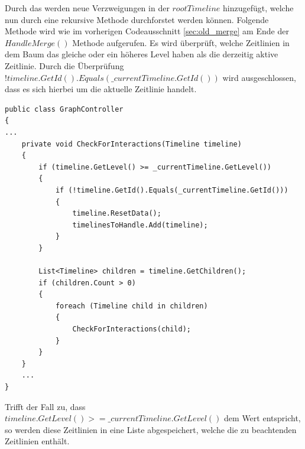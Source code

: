 Durch das  werden neue Verzweigungen in der $rootTimeline$ hinzugefügt, welche nun durch eine rekursive Methode durchforstet werden können. Folgende Methode wird wie im vorherigen Codeausschnitt \ref{sec:old_merge} am Ende der $HandleMerge()$ Methode aufgerufen. Es wird überprüft, welche Zeitlinien in dem Baum das gleiche oder ein höheres Level haben als die derzeitig aktive Zeitlinie. Durch die Überprüfung $!timeline.GetId().Equals(\_currentTimeline.GetId())$ wird ausgeschlossen, dass es sich hierbei um die aktuelle Zeitlinie handelt.

\begin{lstlisting}[caption={HandleMerge Methode aus dem alten Prototyp}, label={sec:old_checkForInteractions}]
public class GraphController
{
...
    private void CheckForInteractions(Timeline timeline)
    {
        if (timeline.GetLevel() >= _currentTimeline.GetLevel())
        {
            if (!timeline.GetId().Equals(_currentTimeline.GetId()))
            {
                timeline.ResetData();
                timelinesToHandle.Add(timeline);
            }
        }

        List<Timeline> children = timeline.GetChildren();
        if (children.Count > 0)
        {
            foreach (Timeline child in children)
            {
                CheckForInteractions(child);
            }
        }
    }
    ...
}
\end{lstlisting}

Trifft der Fall zu, dass $timeline.GetLevel() >= \_currentTimeline.GetLevel()$ dem Wert  entspricht, so werden diese Zeitlinien in eine Liste abgespeichert, welche die zu beachtenden Zeitlinien enthält.

